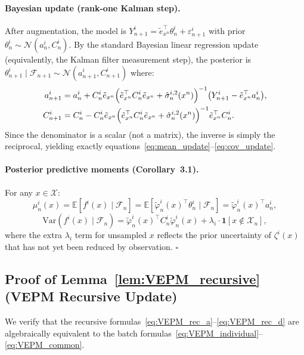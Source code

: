 \documentclass[12pt]{article}
\theoremstyle{plain}
\theoremstyle{definition}
\theoremstyle{remark}
\begin{document}
\paragraph{Bayesian update (rank-one Kalman step).}
After augmentation, the model is $Y^i_{n+1} = \tilde{e}_{x^n}^\top \theta^i_{n}
+ \varepsilon^i_{n+1}$ with prior $\theta^i_n \sim \mathcal{N}(a^i_n, C^i_n)$.
By the standard Bayesian linear regression update (equivalently, the
Kalman filter measurement step), the posterior is
$\theta^i_{n+1} \mid \mathcal{F}_{n+1} \sim \mathcal{N}(a^i_{n+1}, C^i_{n+1})$
where:
\begin{align*}
  a^i_{n+1}
  &= a^i_n + C^i_n \tilde{e}_{x^n}
     \Bigl(\tilde{e}_{x^n}^\top C^i_n \tilde{e}_{x^n}
           + \hat{\sigma}^{i,2}_n(x^n)\Bigr)^{-1}
     \bigl(Y^i_{n+1} - \tilde{e}_{x^n}^\top a^i_n\bigr), \\
  C^i_{n+1}
  &= C^i_n - C^i_n \tilde{e}_{x^n}
     \Bigl(\tilde{e}_{x^n}^\top C^i_n \tilde{e}_{x^n}
           + \hat{\sigma}^{i,2}_n(x^n)\Bigr)^{-1}
     \tilde{e}_{x^n}^\top C^i_n.
\end{align*}
Since the denominator is a scalar (not a matrix), the inverse is simply
the reciprocal, yielding exactly equations~\eqref{eq:mean_update}--\eqref{eq:cov_update}.

\paragraph{Posterior predictive moments (Corollary~3.1).}
For any $x \in \mathcal{X}$:
\[
  \mu^i_n(x)
  = \mathbb{E}[f^i(x) \mid \mathcal{F}_n]
  = \mathbb{E}[\tilde{\varphi}^i_n(x)^\top \theta^i_n \mid \mathcal{F}_n]
  = \tilde{\varphi}^i_n(x)^\top a^i_n,
\]
\[
  \mathrm{Var}(f^i(x) \mid \mathcal{F}_n)
  = \tilde{\varphi}^i_n(x)^\top C^i_n \tilde{\varphi}^i_n(x)
    + \lambda_i \cdot \mathbf{1}[x \notin \mathcal{X}_n],
\]
where the extra $\lambda_i$ term for unsampled $x$ reflects the prior
uncertainty of $\zeta^i(x)$ that has not yet been reduced by observation.
\hfill$\square$

\subsection{Proof of Lemma~\ref{lem:VEPM_recursive} (VEPM Recursive Update)}\label{app:proof_VEPM}

We verify that the recursive formulas~\eqref{eq:VEPM_rec_a}--\eqref{eq:VEPM_rec_d}
are algebraically equivalent to the batch formulas~\eqref{eq:VEPM_individual}--\eqref{eq:VEPM_common}.
\end{document}
